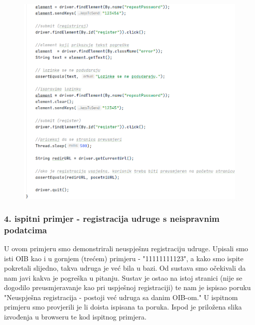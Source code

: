 			 \begin{figure}[H]
			 	\includegraphics[scale=0.75]{slike/Selenium3.2.PNG} %
			 	\centering
			 \end{figure}
			 
			 
			 
			  \subsubsection{4. ispitni primjer - registracija udruge s neispravnim podatcima}
			 
			 U ovom primjeru smo demonstrirali neuspješnu registraciju udruge. Upisali smo isti OIB kao i u gornjem (trećem) primjeru - "11111111123", a kako smo ispite pokretali slijedno, takva udruga je već bila u bazi. Od sustava smo očekivali da nam javi kakva je pogreška u pitanju. Sustav je ostao na istoj stranici (nije se dogodilo preusmjeravanje kao pri uspješnoj registraciji) te nam je ispisao poruku "Neuspješna registracija - postoji već udruga sa danim OIB-om." U ispitnom primjeru smo provjerili je li doista ispisana ta poruka. Ispod je priložena slika izvođenja u browseru te kod ispitnog primjera. 
			 

